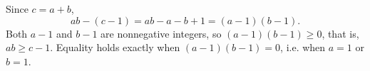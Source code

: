 Since $c=a+b$,
\[ab-(c-1)=ab-a-b+1=(a-1)(b-1).\]
Both $a-1$ and $b-1$ are nonnegative integers, so $(a-1)(b-1)\ge0$, that is, $ab\ge c-1$. Equality holds exactly when $(a-1)(b-1)=0$, i.e. when $a=1$ or $b=1$.
